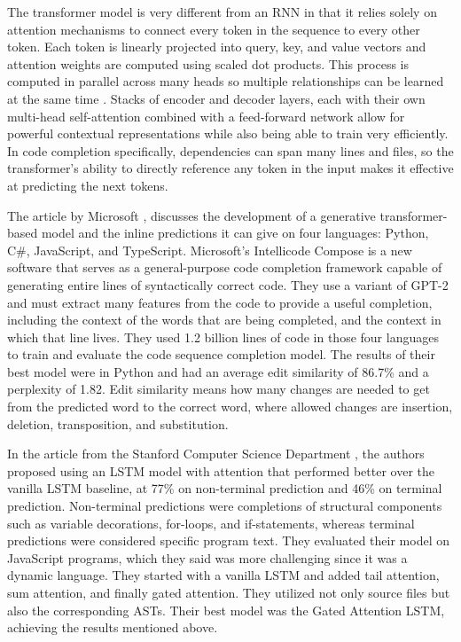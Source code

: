 \documentclass[11pt]{article}
\begin{document}
The transformer model is very different from an RNN in that it relies solely on attention mechanisms to connect every token in the sequence to every other token. Each token is linearly projected into query, key, and value vectors and attention weights are computed using scaled dot products. This process is computed in parallel across many heads so multiple relationships can be learned at the same time \cite{attention}. Stacks of encoder and decoder layers, each with their own multi-head self-attention combined with a feed-forward network allow for powerful contextual representations while also being able to train very efficiently. In code completion specifically, dependencies can span many lines and files, so the transformer's ability to directly reference any token in the input makes it effective at predicting the next tokens.

The article by Microsoft \cite{microsoft}, discusses the development of a generative transformer-based model and the inline predictions it can give on four languages: Python, C\#, JavaScript, and TypeScript. Microsoft's Intellicode Compose is a new software that serves as a general-purpose code completion framework capable of generating entire lines of syntactically correct code. They use a variant of GPT-2 and must extract many features from the code to provide a useful completion, including the context of the words that are being completed, and the context in which that line lives. They used 1.2 billion lines of code in those four languages to train and evaluate the code sequence completion model. The results of their best model were in Python and had an average edit similarity of 86.7\% and a perplexity of 1.82. Edit similarity means how many changes are needed to get from the predicted word to the correct word, where allowed changes are insertion, deletion, transposition, and substitution.

In the article from the Stanford Computer Science Department \cite{stanford}, the authors proposed using an LSTM model with attention that performed better over the vanilla LSTM baseline, at 77\% on non-terminal prediction and 46\% on terminal prediction. Non-terminal predictions were completions of structural components such as variable decorations, for-loops, and if-statements, whereas terminal predictions were considered specific program text. They evaluated their model on JavaScript programs, which they said was more challenging since it was a dynamic language. They started with a vanilla LSTM and added tail attention, sum attention, and finally gated attention. They utilized not only source files but also the corresponding ASTs. Their best model was the Gated Attention LSTM, achieving the results mentioned above. 
\end{document}
